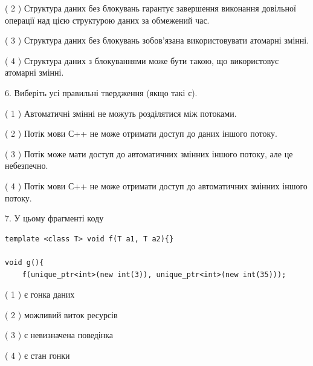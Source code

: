 \documentclass[12pt, ukrainian]{article}
\begin{document}
\begin {large}
{( 2 ) Структура даних без блокувань гарантує завершення виконання довільної операції над цією структурою даних за обмежений час.%

( 3 ) Структура даних без блокувань зобов’язана використовувати атомарні змінні.%

( 4 ) Структура даних з блокуваннями може бути такою, що використовує атомарні змінні.%
\newpage



\vspace{5mm}
6. Виберіть усі правильні твердження (якщо такі є).\par
\vspace{2mm}

( 1 ) Автоматичні змінні не можуть розділятися між потоками.%

( 2 ) Потік мови С++ не може отримати доступ до даних іншого потоку.%

( 3 ) Потік може мати доступ до автоматичних змінних іншого потоку, але це небезпечно.%

( 4 ) Потік мови С++ не може отримати доступ до автоматичних змінних іншого потоку.%


\vspace{5mm}
7. У цьому фрагменті коду
\begin{verbatim}
template <class T> void f(T a1, T a2){}

void g(){
    f(unique_ptr<int>(new int(3)), unique_ptr<int>(new int(35)));
\end{verbatim}

( 1 ) є гонка даних%

( 2 ) можливий виток ресурсів%

( 3 ) є невизначена поведінка%

( 4 ) є стан гонки%
}
\end {large}
\end{document}

